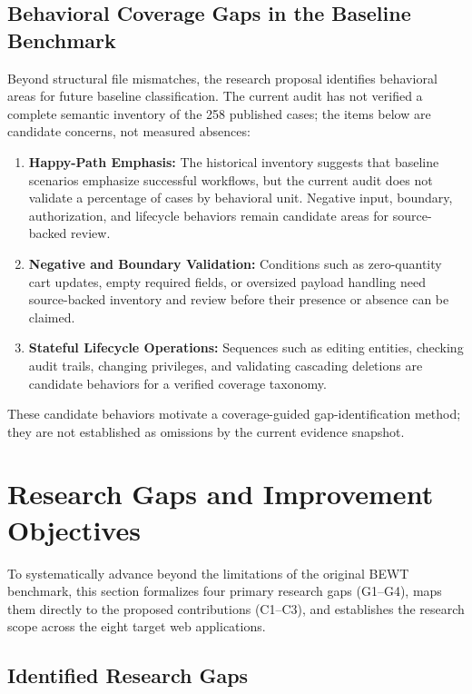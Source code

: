 \documentclass[pdflatex,sn-mathphys-num]{sn-jnl}
\begin{document}
\subsection{Behavioral Coverage Gaps in the Baseline Benchmark}

Beyond structural file mismatches, the research proposal identifies behavioral areas for future baseline classification. The current audit has not verified a complete semantic inventory of the 258 published cases; the items below are candidate concerns, not measured absences:
\begin{enumerate}
    \item \textbf{Happy-Path Emphasis:} The historical inventory suggests that baseline scenarios emphasize successful workflows, but the current audit does not validate a percentage of cases by behavioral unit. Negative input, boundary, authorization, and lifecycle behaviors remain candidate areas for source-backed review.
    \item \textbf{Negative and Boundary Validation:} Conditions such as zero-quantity cart updates, empty required fields, or oversized payload handling need source-backed inventory and review before their presence or absence can be claimed.
    \item \textbf{Stateful Lifecycle Operations:} Sequences such as editing entities, checking audit trails, changing privileges, and validating cascading deletions are candidate behaviors for a verified coverage taxonomy.
\end{enumerate}
These candidate behaviors motivate a coverage-guided gap-identification method; they are not established as omissions by the current evidence snapshot.


\section{Research Gaps and Improvement Objectives}\label{sec:research-gaps}

To systematically advance beyond the limitations of the original BEWT benchmark, this section formalizes four primary research gaps (G1--G4), maps them directly to the proposed contributions (C1--C3), and establishes the research scope across the eight target web applications.

\subsection{Identified Research Gaps}
\end{document}

